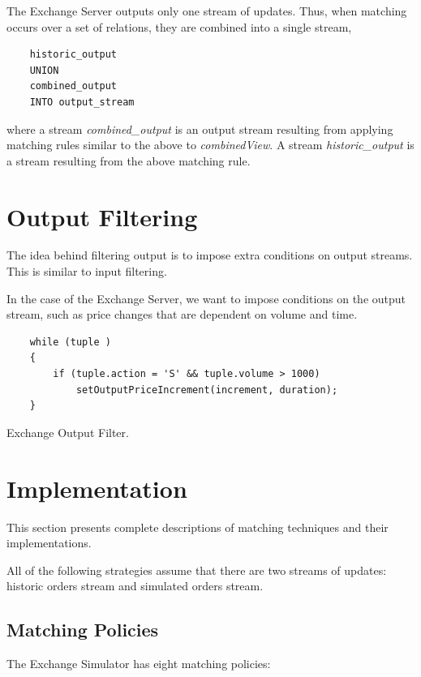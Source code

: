 \documentclass{article}
\begin{document}
The Exchange Server outputs only one stream of updates. Thus, when matching occurs over a set of relations, they are combined into a single stream,  

\begin{verbatim}
    historic_output
    UNION
    combined_output
    INTO output_stream
\end{verbatim}

\noindent where a stream \emph{combined\_output} is an output stream resulting from applying matching rules similar to the above to \emph{combinedView}. A stream \emph{historic\_output} is a stream resulting from the above matching rule. 


\section{Output Filtering} 

The idea behind filtering output is to impose extra conditions on output streams. This is similar to input filtering. 

In the case of the Exchange Server, we want to impose conditions on the output stream, such as price changes that are dependent on volume and time. 
\begin{program}
    \begin{verbatim}  
    while (tuple )
    {
        if (tuple.action = 'S' && tuple.volume > 1000)
            setOutputPriceIncrement(increment, duration);
    }
    \end{verbatim}
\caption{Exchange Output Filter.}
\end{program}

\section{Implementation}

This section presents complete descriptions of matching techniques and their implementations. 

All of the following strategies assume that there are two streams of updates: historic orders stream and simulated orders stream.

\subsection{Matching Policies}

The Exchange Simulator has eight matching policies:
\end{document}
